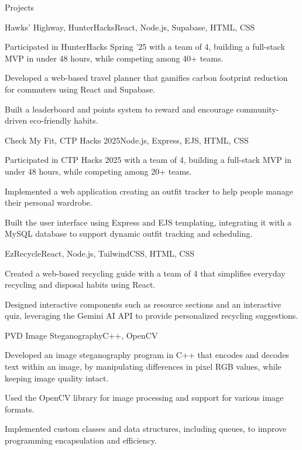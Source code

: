 \documentclass[]{rh-resume}
\begin{document}
\begin{section}{Projects}



\begin{subsectionproject}{Hawks' Highway, HunterHacks}{React, Node.js, Supabase, HTML, CSS}{}
    \item{Participated in HunterHacks Spring ’25 with a team of 4, building a full-stack MVP in under 48 hours, while competing among 40+ teams.}
    \item{Developed a web-based travel planner that gamifies carbon footprint reduction for commuters using React and Supabase.}
    \item{Built a leaderboard and points system to reward and encourage community-driven eco-friendly habits.}    
\end{subsectionproject}

\begin{subsectionproject}{Check My Fit, CTP Hacks 2025}{Node.js, Express, EJS, HTML, CSS}{}
    \item{Participated in CTP Hacks 2025 with a team of 4, building a full-stack MVP in under 48 hours, while competing among 20+ teams.}
    \item{Implemented a web application creating an outfit tracker to help people manage their personal wardrobe.}   
    \item{Built the user interface using Express and EJS templating, integrating it with a MySQL database to support dynamic outfit tracking and scheduling.}
\end{subsectionproject}

\begin{subsectionproject}{EzRecycle}{React, Node.js, TailwindCSS, HTML, CSS}{}
    \item{Created a web-based recycling guide with a team of 4 that simplifies everyday recycling and disposal habits using React.}
    \item{Designed interactive components such as resource sections and an interactive quiz, leveraging the Gemini AI API to provide personalized recycling suggestions.}   
\end{subsectionproject}

\begin{subsectionproject}{PVD Image Steganography}{C++, OpenCV}{}
    \item{Developed an image steganography program in C++ that encodes and decodes text within an image, by manipulating differences in pixel RGB values, while keeping image quality intact.}
    \item{Used the OpenCV library for image processing and support for various image formats.}
    \item{Implemented custom classes and data structures, including queues, to improve programming encapsulation and efficiency. }    
\end{subsectionproject}


\end{section}
\end{document}
